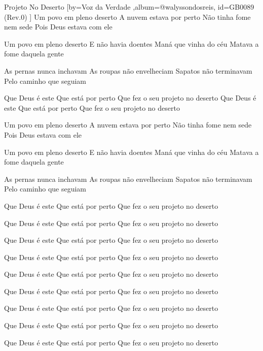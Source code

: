 \beginsong
{Projeto No Deserto %
}[by={Voz da Verdade %
},album={@walyssondosreis},
id={GB0089 %
(Rev.0) %
}]
Um povo em pleno deserto
A nuvem estava por perto
Não tinha fome nem sede
Pois Deus estava com ele

Um povo em pleno deserto
E não havia doentes
Maná que vinha do céu
Matava a fome daquela gente

As pernas nunca inchavam
As roupas não envelheciam
Sapatos não terminavam
Pelo caminho que seguiam

Que Deus é este
Que está por perto
Que fez o seu projeto no deserto
Que Deus é este
Que está por perto
Que fez o seu projeto no deserto

Um povo em pleno deserto
A nuvem estava por perto
Não tinha fome nem sede
Pois Deus estava com ele

Um povo em pleno deserto
E não havia doentes
Maná que vinha do céu
Matava a fome daquela gente

As pernas nunca inchavam
As roupas não envelheciam
Sapatos não terminavam
Pelo caminho que seguiam

Que Deus é este
Que está por perto
Que fez o seu projeto no deserto

Que Deus é este
Que está por perto
Que fez o seu projeto no deserto

Que Deus é este
Que está por perto
Que fez o seu projeto no deserto

Que Deus é este
Que está por perto
Que fez o seu projeto no deserto

Que Deus é este
Que está por perto
Que fez o seu projeto no deserto

Que Deus é este
Que está por perto
Que fez o seu projeto no deserto

Que Deus é este
Que está por perto
Que fez o seu projeto no deserto

Que Deus é este
Que está por perto
Que fez o seu projeto no deserto

Que Deus é este
Que está por perto
Que fez o seu projeto no deserto

